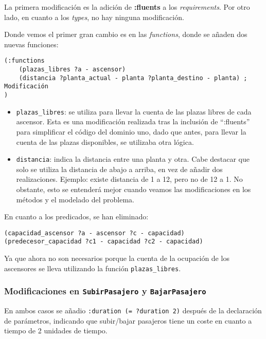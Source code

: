 \documentclass{article}
\begin{document}
La primera modificación es la adición de \textbf{:fluents} a los \emph{requirements}. Por otro lado, en cuanto a los \emph{types}, no hay ninguna modificación.

Donde vemos el primer gran cambio es en las \emph{functions}, donde se añaden dos nuevas funciones:

\begin{verbatim}
(:functions
    (plazas_libres ?a - ascensor)
    (distancia ?planta_actual - planta ?planta_destino - planta) ; Modificación
)
\end{verbatim}

\begin{itemize}
    \item \texttt{plazas\_libres}: se utiliza para llevar la cuenta de las plazas libres de cada ascensor. Esta es una modificación realizada tras la inclusión de ``:fluents'' para simplificar el código del dominio uno, dado que antes, para llevar la cuenta de las plazas disponibles, se utilizaba otra lógica.
    
    \item \texttt{distancia}: indica la distancia entre una planta y otra. Cabe destacar que solo se utiliza la distancia de abajo a arriba, en vez de añadir dos realizaciones. Ejemplo: existe distancia de 1 a 12, pero no de 12 a 1. No obstante, esto se entenderá mejor cuando veamos las modificaciones en los métodos y el modelado del problema.
\end{itemize}

En cuanto a los predicados, se han eliminado:

\begin{verbatim}
(capacidad_ascensor ?a - ascensor ?c - capacidad)
(predecesor_capacidad ?c1 - capacidad ?c2 - capacidad)
\end{verbatim}

Ya que ahora no son necesarios porque la cuenta de la ocupación de los ascensores se lleva utilizando la función \texttt{plazas\_libres}.


\subsubsection{Modificaciones en \texttt{SubirPasajero} y \texttt{BajarPasajero}}
En ambos casos se añadio \texttt{:duration (= ?duration 2)} después de la declaración de parámetros, indicando que subir/bajar pasajeros tiene un coste en cuanto a tiempo de 2 unidades de tiempo.
\end{document}
